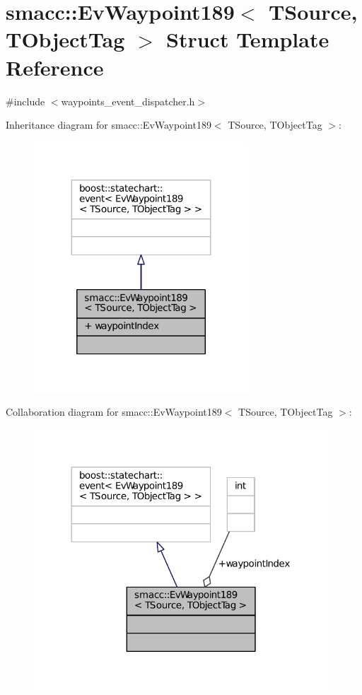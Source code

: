 \hypertarget{structsmacc_1_1EvWaypoint189}{}\section{smacc\+:\+:Ev\+Waypoint189$<$ T\+Source, T\+Object\+Tag $>$ Struct Template Reference}
\label{structsmacc_1_1EvWaypoint189}


{\ttfamily \#include $<$waypoints\+\_\+event\+\_\+dispatcher.\+h$>$}



Inheritance diagram for smacc\+:\+:Ev\+Waypoint189$<$ T\+Source, T\+Object\+Tag $>$\+:
\nopagebreak
\begin{figure}[H]
\begin{center}
\leavevmode
\includegraphics[width=227pt]{structsmacc_1_1EvWaypoint189__inherit__graph}
\end{center}
\end{figure}


Collaboration diagram for smacc\+:\+:Ev\+Waypoint189$<$ T\+Source, T\+Object\+Tag $>$\+:
\nopagebreak
\begin{figure}[H]
\begin{center}
\leavevmode
\includegraphics[width=312pt]{structsmacc_1_1EvWaypoint189__coll__graph}
\end{center}
\end{figure}
